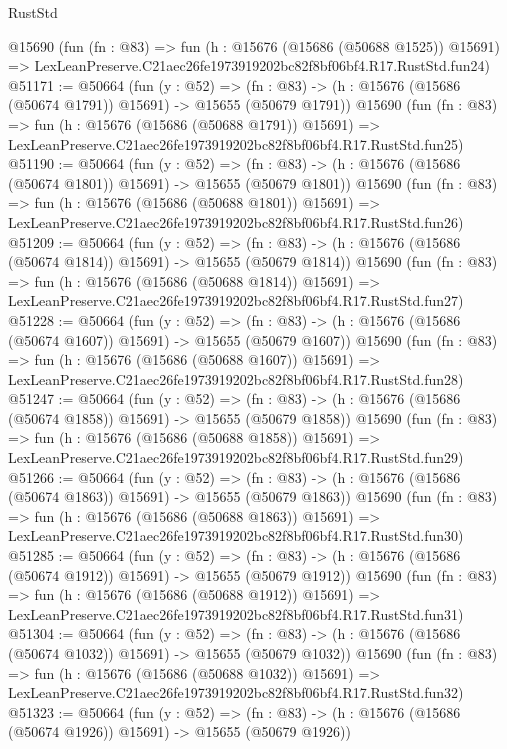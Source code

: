 \begin{lexlean}{RustStd}
\begin{coremodule}
    @15690
    (fun (fn : @83) =>
    fun (h : @15676 (@15686 (@50688 @1525)) @15691) =>
    LexLeanPreserve.C21aec26fe1973919202bc82f8bf06bf4.R17.RustStd.fun24)
@51171 := @50664
    (fun (y : @52) =>
    (fn : @83) -> (h : @15676 (@15686 (@50674 @1791)) @15691) -> @15655 (@50679 @1791))
    @15690
    (fun (fn : @83) =>
    fun (h : @15676 (@15686 (@50688 @1791)) @15691) =>
    LexLeanPreserve.C21aec26fe1973919202bc82f8bf06bf4.R17.RustStd.fun25)
@51190 := @50664
    (fun (y : @52) =>
    (fn : @83) -> (h : @15676 (@15686 (@50674 @1801)) @15691) -> @15655 (@50679 @1801))
    @15690
    (fun (fn : @83) =>
    fun (h : @15676 (@15686 (@50688 @1801)) @15691) =>
    LexLeanPreserve.C21aec26fe1973919202bc82f8bf06bf4.R17.RustStd.fun26)
@51209 := @50664
    (fun (y : @52) =>
    (fn : @83) -> (h : @15676 (@15686 (@50674 @1814)) @15691) -> @15655 (@50679 @1814))
    @15690
    (fun (fn : @83) =>
    fun (h : @15676 (@15686 (@50688 @1814)) @15691) =>
    LexLeanPreserve.C21aec26fe1973919202bc82f8bf06bf4.R17.RustStd.fun27)
@51228 := @50664
    (fun (y : @52) =>
    (fn : @83) -> (h : @15676 (@15686 (@50674 @1607)) @15691) -> @15655 (@50679 @1607))
    @15690
    (fun (fn : @83) =>
    fun (h : @15676 (@15686 (@50688 @1607)) @15691) =>
    LexLeanPreserve.C21aec26fe1973919202bc82f8bf06bf4.R17.RustStd.fun28)
@51247 := @50664
    (fun (y : @52) =>
    (fn : @83) -> (h : @15676 (@15686 (@50674 @1858)) @15691) -> @15655 (@50679 @1858))
    @15690
    (fun (fn : @83) =>
    fun (h : @15676 (@15686 (@50688 @1858)) @15691) =>
    LexLeanPreserve.C21aec26fe1973919202bc82f8bf06bf4.R17.RustStd.fun29)
@51266 := @50664
    (fun (y : @52) =>
    (fn : @83) -> (h : @15676 (@15686 (@50674 @1863)) @15691) -> @15655 (@50679 @1863))
    @15690
    (fun (fn : @83) =>
    fun (h : @15676 (@15686 (@50688 @1863)) @15691) =>
    LexLeanPreserve.C21aec26fe1973919202bc82f8bf06bf4.R17.RustStd.fun30)
@51285 := @50664
    (fun (y : @52) =>
    (fn : @83) -> (h : @15676 (@15686 (@50674 @1912)) @15691) -> @15655 (@50679 @1912))
    @15690
    (fun (fn : @83) =>
    fun (h : @15676 (@15686 (@50688 @1912)) @15691) =>
    LexLeanPreserve.C21aec26fe1973919202bc82f8bf06bf4.R17.RustStd.fun31)
@51304 := @50664
    (fun (y : @52) =>
    (fn : @83) -> (h : @15676 (@15686 (@50674 @1032)) @15691) -> @15655 (@50679 @1032))
    @15690
    (fun (fn : @83) =>
    fun (h : @15676 (@15686 (@50688 @1032)) @15691) =>
    LexLeanPreserve.C21aec26fe1973919202bc82f8bf06bf4.R17.RustStd.fun32)
@51323 := @50664
    (fun (y : @52) =>
    (fn : @83) -> (h : @15676 (@15686 (@50674 @1926)) @15691) -> @15655 (@50679 @1926))

\end{coremodule}
\end{lexlean}
